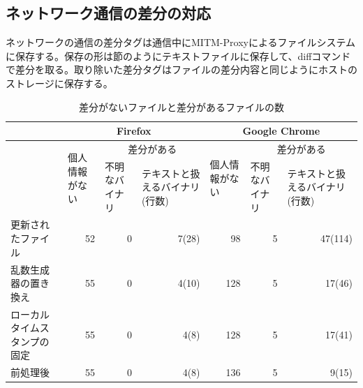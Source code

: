 \documentclass[a4paper,twocolumn,10pt]{jarticle}
\begin{document}
\subsection{ネットワーク通信の差分の対応}
ネットワークの通信の差分タグは通信中にMITM-Proxyによるファイルシステムに保存する。保存の形は節\label{sec:net}のようにテキストファイルに保存して、diffコマンドで差分を取る。取り除いた差分タグはファイルの差分内容と同じようにホストのストレージに保存する。








 
 
\begin{table}[ht]
\caption{差分がないファイルと差分があるファイルの数}
\centering
\begin{tabular}{|p{2cm}|l|p{1.9cm}|p{1.9cm}|l|p{1.9cm}|p{1.9cm}|}
\hline
&\multicolumn{3}{|c|}{\footnotesize{Firefox}}&\multicolumn{3}{c|}{\footnotesize{Google Chrome}}\\
\hline
&\multirow{2}{1.5cm}{\footnotesize{個人情報がない}} &
\multicolumn{2}{c|}{\footnotesize{差分がある}} &\multirow{2}{1.5cm}{\footnotesize{個人情報がない}}&
\multicolumn{2}{c|}{\footnotesize{差分がある}} \\
\cline{3-4}\cline{6-7}
  & & \footnotesize{不明なバイナリ} & \footnotesize{テキストと扱えるバイナリ(行数)}& &\footnotesize{不明なバイナリ} & \footnotesize{テキストと扱えるバイナリ(行数)} \\
\hline
\footnotesize{更新されたファイル}&\multicolumn{1}{r|}{\footnotesize{52}}&\multicolumn{1}{r|}{\footnotesize{0}}&\multicolumn{1}{r|}{\footnotesize{7(28)}}  & \multicolumn{1}{r|}{\footnotesize{98}} & \multicolumn{1}{r|}{\footnotesize{5}} & \multicolumn{1}{r|}{\footnotesize{47(114)}} \\
\hline
\footnotesize{乱数生成器の置き換え}&\multicolumn{1}{r|}{\footnotesize{55}}&\multicolumn{1}{r|}{\footnotesize{0}}&\multicolumn{1}{r|}{\footnotesize{4(10)} }& \multicolumn{1}{r|}{\footnotesize{128} }& \multicolumn{1}{r|}{\footnotesize{5} }& \multicolumn{1}{r|}{\footnotesize{17(46)}} \\
\hline
\footnotesize{ローカルタイムスタンプの固定}&\multicolumn{1}{r|}{\footnotesize{55}}&\multicolumn{1}{r|}{\footnotesize{0}}&\multicolumn{1}{r|}{\footnotesize{4(8)} }&  \multicolumn{1}{r|}{\footnotesize{128} }& \multicolumn{1}{r|}{\footnotesize{5} }&\multicolumn{1}{r|}{\footnotesize{17(41) }}\\
\hline
\footnotesize{前処理後}&\multicolumn{1}{r|}{\footnotesize{55}}&\multicolumn{1}{r|}{\footnotesize{0}}&\multicolumn{1}{r|}{\footnotesize{4(8)}} &\multicolumn{1}{r|}{ \footnotesize{136} }& \multicolumn{1}{r|}{\footnotesize{5} }&\multicolumn{1}{r|}{\footnotesize{9(15)}}\\
\hline
\end{tabular}
\label{fig:result}
\end{table}
\end{document}
